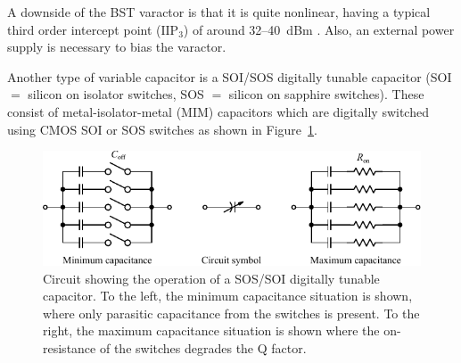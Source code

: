 A downside of the BST varactor is that it is quite nonlinear, having a typical third order intercept point ($\text{IIP}_3$) of around 32--\SI{40}{dBm} \cite{gu2014rf}. Also, an external power supply is necessary to bias the varactor.

Another type of variable capacitor is a SOI/SOS digitally tunable capacitor (SOI $=$ silicon on isolator switches, SOS $=$ silicon on sapphire switches). These consist of metal-isolator-metal (MIM) capacitors which are digitally switched using CMOS SOI or SOS switches as shown in Figure~\ref{fig:sossoiswitch}.
\begin{figure}[htbp]
    \centering
    \includegraphics{img/analysis/sossoi_dtc}
    \caption{Circuit showing the operation of a SOS/SOI digitally tunable capacitor. To the left, the minimum capacitance situation is shown, where only parasitic capacitance from the switches is present. To the right, the maximum capacitance situation is shown where the on-resistance of the switches degrades the Q factor.}
    \label{fig:sossoiswitch}
\end{figure}


% 
% 
% 
% 

